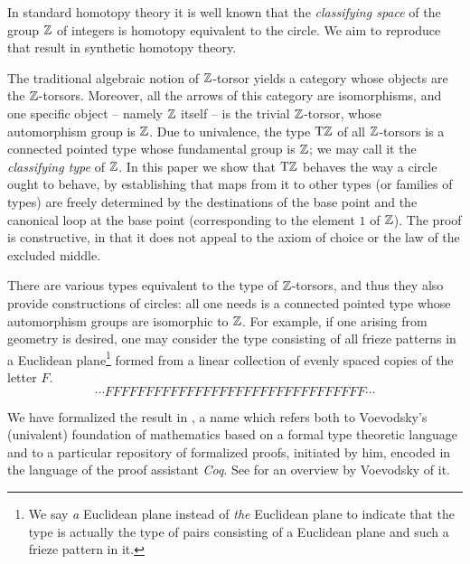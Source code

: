 \documentclass[a4paper,12pt]{amsart}
\begin{document}
In standard homotopy theory it is well known that the {\em classifying space} of the group $\mathbb{Z}$ of integers is
homotopy equivalent to the circle.  We aim to reproduce that result in synthetic homotopy theory.

The traditional algebraic notion of $\mathbb{Z}$-torsor yields a category {whose objects are the $\mathbb{Z}$-torsors.
Moreover, all the arrows of this category are isomorphisms, and
one specific object  -- namely $\mathbb{Z}$ itself -- is the trivial $\mathbb{Z}$-torsor, whose automorphism group is $\mathbb{Z}$.}
Due to univalence, the type ${\mathrm{T}\mathbb{Z}}$ of all $\mathbb{Z}$-torsors
is a connected pointed type whose fundamental group is $\mathbb{Z}$; we may call it the {\em classifying type} of $\mathbb{Z}$.
In this paper we show that ${\mathrm{T}\mathbb{Z}}$ behaves the way a circle ought to behave,
by establishing that maps from it to other types (or families of types) are freely determined
by the destinations of the base point and the canonical loop at the base point (corresponding to the element $1$ of $\mathbb{Z}$).
The proof is constructive, in that it does not appeal to the axiom of choice or the law of the excluded middle.

There are various types equivalent to the type of $\mathbb{Z}$-torsors, and thus they also provide constructions of circles: all one needs is a
connected pointed type whose automorphism groups are isomorphic to $\mathbb{Z}$.  For example, if one arising from geometry is desired, one may
consider the type consisting of all frieze patterns in a Euclidean plane\footnote{We say \emph{a} Euclidean plane instead of {\em the} Euclidean
  plane to indicate that the type is actually the type of pairs consisting of a Euclidean plane and such a frieze pattern in it.} formed from a
linear collection of evenly spaced copies of the letter $F$.
$$ \cdots FFFFFFFFFFFFFFFFFFFFFFFFFFFFFFFF \cdots $$

\bgroup
We have formalized the result in \UniMath{}, a name which refers both to Voevodsky's (univalent) foundation of mathematics based on a formal
type theoretic language and to a particular repository \cite{UniMath} of formalized proofs, initiated by him, encoded in the language of the
proof assistant {\em Coq}.  See \cite{VV-UniMath-1} for an overview by Voevodsky of it.
\end{document}
